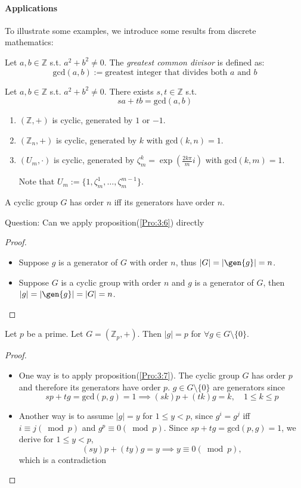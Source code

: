 \paragraph{Applications}
To illustrate some examples, we introduce some results from discrete mathematics:
\begin{definition}
Let $a,b\in\mathbb{Z}$ s.t. $a^2+b^2\ne0$. The \emph{greatest common divisor} is defined as:
\[
\mbox{gcd}(a,b):=\mbox{greatest integer that divides both $a$ and $b$}
\]
\end{definition}
\begin{theorem}
Let $a,b\in\mathbb{Z}$ s.t. $a^2+b^2\ne0$. There exists $s,t\in\mathbb{Z}$ s.t.
\[
sa+tb = \mbox{gcd}(a,b)
\]
\end{theorem}
\begin{example}
\begin{enumerate}
\item
$(\mathbb{Z},+)$ is cyclic, generated by $1$ or $-1$.
\item
$(\mathbb{Z}_n,+)$ is cyclic, generated by $k$ with $\mbox{gcd}(k,n)=1$.
\item
$(U_m,\cdot)$ is cyclic, generated by $\zeta_m^k=\exp(\frac{2k\pi}{m}i)$ with $\mbox{gcd}(k,m)=1$.

Note that $U_m:=\{1,\zeta_m^1,\dots,\zeta_m^{m-1}\}$.
\end{enumerate}
\end{example}
\begin{proposition}\label{Pro:3:7}
A cyclic group $G$ has order $n$ iff its generators have order $n$.
\end{proposition}
Question: Can we apply proposition(\ref{Pro:3:6}) directly
\begin{proof}
\begin{itemize}
\item
Suppose $g$ is a generator of $G$ with order $n$, thus $|G| = |\gen{g}|=n$.
\item
Suppose $G$ is a cyclic group with order $n$ and $g$ is a generator of $G$, then $|g| = |\gen{g}|=|G|=n$.
\end{itemize}
\end{proof}
\begin{proposition}
 Let $p$ be a prime. Let $G=(\mathbb{Z}_p,+).$ Then $|g|=p$ for $\forall g\in G\setminus\{0\}$.
\end{proposition}
\begin{proof}
\begin{itemize}
\item
One way is to apply proposition(\ref{Pro:3:7}). The cyclic group $G$ has order $p$ and therefore its generators have order $p$. $g\in G\setminus\{0\}$ are generators since
\[
sp+tg=\mbox{gcd}(p,g)=1\implies
(sk)p+(tk)g=k,\quad 1\le k\le p
\]
\item
Another way is to assume $|g|=y$ for $1\le y<p$, since $g^i=g^{j}$ iff $i\equiv j(\bmod p)$ and $g^p\equiv0(\bmod p)$. Since $sp+tg=\mbox{gcd}(p,g)=1$, we derive for $1\le y<p$,
\[
(sy)p+(ty)g=y\implies y\equiv 0(\bmod p),
\]
which is a contradiction
\end{itemize}
\end{proof}

